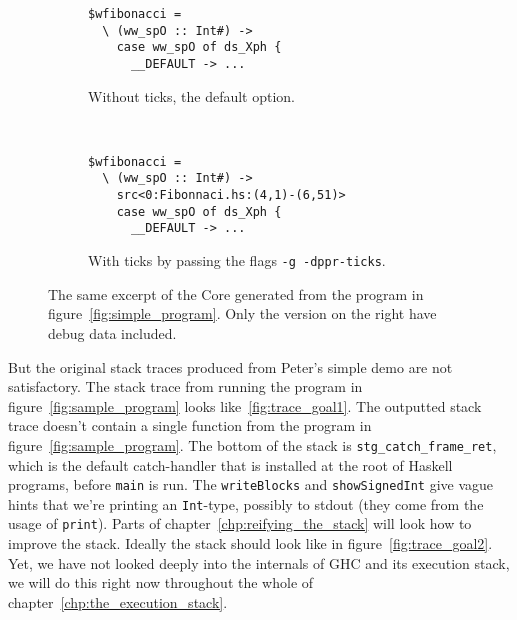 \begin{figure}
\begin{mdframed}
        \begin{subfigure}[t]{0.4\textwidth}
            \begin{verbatim}
$wfibonacci =
  \ (ww_spO :: Int#) ->
    case ww_spO of ds_Xph {
      __DEFAULT -> ...
            \end{verbatim}
            \caption{Without ticks, the default option.}
        \end{subfigure}
        ~ %
        \begin{subfigure}[t]{0.6\textwidth}
          \begin{verbatim}
$wfibonacci =
  \ (ww_spO :: Int#) ->
    src<0:Fibonnaci.hs:(4,1)-(6,51)>
    case ww_spO of ds_Xph {
      __DEFAULT -> ...
          \end{verbatim}
          \caption{With ticks by passing the flags \texttt{-g -dppr-ticks}.}
        \end{subfigure}
        \caption{The same excerpt of the Core generated from the program
in figure~\ref{fig:simple_program}. Only the version on the right have
debug data included.}\label{fig:core_and_ticks}
\end{mdframed}
\end{figure}

But the original stack traces produced from Peter's simple demo
are not satisfactory. The stack trace from running the program in
figure~\ref{fig:sample_program} looks like~\ref{fig:trace_goal1}.
The outputted stack trace doesn't contain a single function from the
program in figure~\ref{fig:sample_program}. The bottom of the stack is
\texttt{stg\_catch\_frame\_ret}, which is the default catch-handler that
is installed at the root of Haskell programs, before \texttt{main} is
run. The \texttt{writeBlocks} and \texttt{showSignedInt} give vague
hints that we're printing an \texttt{Int}-type, possibly to stdout
(they come from the usage of \texttt{print}). Parts of chapter~\ref{chp:reifying_the_stack} will look how to improve the stack. Ideally
the stack should look like in figure~\ref{fig:trace_goal2}. Yet, we
have not looked deeply into the internals of GHC and its execution
stack, we will do this right now throughout the whole of chapter~\ref{chp:the_execution_stack}.

